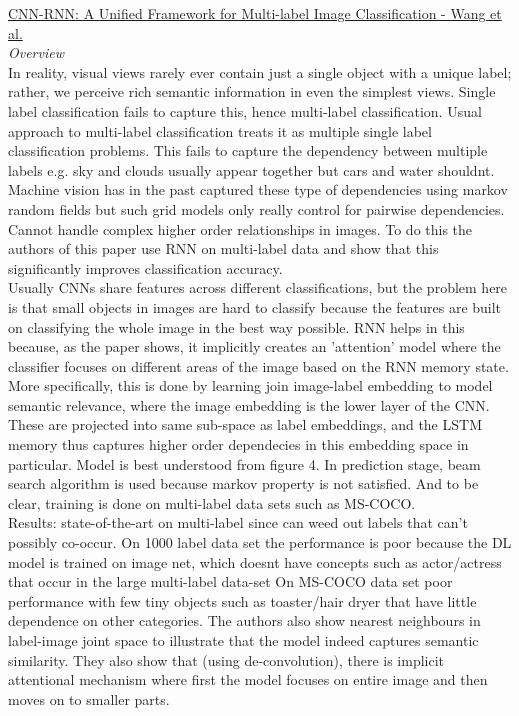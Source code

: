 \documentclass{report}
\begin{document}
\newpage

\underline{CNN-RNN: A Unified Framework for Multi-label Image Classification - Wang et al.} \\
\textit{Overview}\\
In reality, visual views rarely ever contain just a single object with a unique label; rather, we perceive rich semantic information in even the simplest views. Single label classification fails to capture this, hence multi-label classification. Usual approach to multi-label classification treats it as multiple single label classification problems. This fails to capture the dependency between multiple labels e.g. sky and clouds usually appear together but cars and water shouldnt. Machine vision has in the past captured these type of dependencies using markov random fields but such grid models only really control for pairwise dependencies. Cannot handle complex higher order relationships in images. To do this the authors of this paper use RNN on multi-label data and show that this significantly improves classification accuracy. \\

Usually CNNs share features across different classifications, but the problem here is that small objects in images are hard to classify because the features are built on classifying the whole image in the best way possible. RNN helps in this because, as the paper shows, it implicitly creates an 'attention' model where the classifier focuses on different areas of the image based on the RNN memory state. More specifically, this is done by learning join image-label embedding to model semantic relevance, where the image embedding is the lower layer of the CNN. These are projected into same sub-space as label embeddings, and the LSTM memory thus captures higher order dependecies in this embedding space in particular. Model is best understood from figure 4. In prediction stage, beam search algorithm is used because markov property is not satisfied. And to be clear, training is done on multi-label data sets such as MS-COCO. \\

Results: state-of-the-art on multi-label since can weed out labels that can't possibly co-occur. On 1000 label data set the performance is poor because the DL model is trained on image net, which doesnt have concepts such as actor/actress that occur in the large multi-label data-set On MS-COCO data set poor performance with few tiny objects such as toaster/hair dryer that have little dependence on other categories. The authors also show nearest neighbours in label-image joint space to illustrate that the model indeed captures semantic similarity. They also show that (using de-convolution), there is implicit attentional mechanism where first the model focuses on entire image and then moves on to smaller parts. \\
\end{document}
